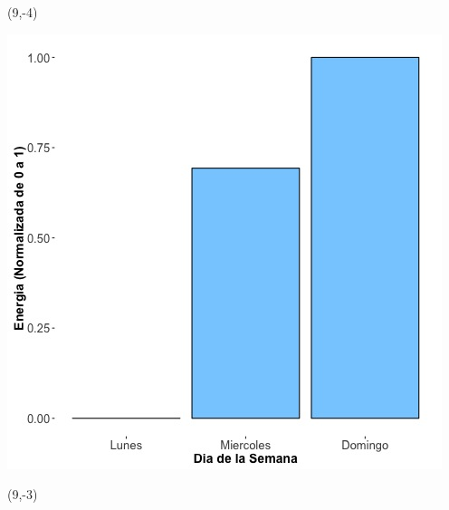 \documentclass{article}\usepackage[]{graphicx}\usepackage[]{color}
\newenvironment{knitrout}{}{} %
\begin{document}
 \begin{textblock}{1}(9,-4)
\begin{minipage}{20em}
\begingroup

\endgroup
\end{minipage}
\end{textblock}


\begin{knitrout}
\color{fgcolor}
\includegraphics[scale=0.65]{figure/A12_day_of_week_plot} 
\end{knitrout}


 \begin{textblock}{1}(9,-3)
\begin{minipage}{20em}
\begingroup

\endgroup
\end{minipage}
\end{textblock}

 \vspace{2cm}
\end{document}

